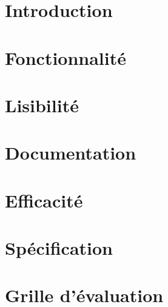 \documentclass{article}
\begin{document}
    \section{Introduction}
    
    \section{Fonctionnalité}
    
    \section{Lisibilité}
    
    \section{Documentation}
    \section{Efficacité}
    
    \section{Spécification}
    
    \section{Grille d'évaluation}
    
    
\end{document}
